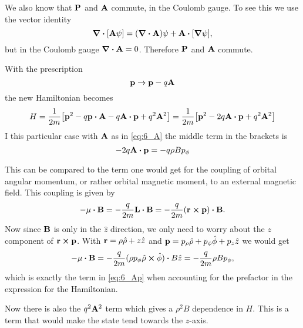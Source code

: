 \documentclass[11pt,letter, swedish, english
]{article}
\begin{document}
We also know that $\vb{P}$ and $\vb{A}$ commute, in the Coulomb
gauge. To see this we use the vector identity
\begin{equation}
\div[\vb{A}\psi]=(\div\vb{A})\psi + \vb{A}\vdot[\grad\psi],
\end{equation}
but in the Coulomb gauge $\div\vb{A}=0$. Therefore $\vb{P}$ and
$\vb{A}$ commute. 

With the prescription
\begin{equation}
\vb{p}\to \vb{p}-q\vb{A}
\end{equation}
the new Hamiltonian becomes
\begin{equation}
H=\frac{1}{2m}\qty[\vb{p}^2-q\vb{p}\vdot\vb{A}-q\vb{A}\vdot\vb{p}+q^2\vb{A}^2]
=\frac{1}{2m}\qty[\vb{p}^2-2q\vb{A}\vdot\vb{p}+q^2\vb{A}^2]
\end{equation}
I this particular case with $\vb{A}$ as in \eqref{eq:6_A} the middle
term in the brackets is
\begin{equation}
-2q\vb{A}\vdot\vb{p}=-q\rho B p_\phi
\end{equation}


This can be compared to the term one would get for the coupling
of orbital angular momentum, or rather orbital magnetic moment,
to an external magnetic field. This coupling is given by
\begin{equation}\label{eq:6_Ap}
-\vb{\mu}\vdot\vb{B}=-\frac{q}{2m}\vb{L}\vdot\vb{B}
=-\frac{q}{2m}(\vb{r}\cross\vb{p})\vdot\vb{B}.
\end{equation}
Now since $\vb{B}$ is only in the $\hat{z}$ direction, we
only need to worry about the $z$ component of
$\vb{r}\cross\vb{p}$. With $\vb{r}=\rho\hat\rho+z\hat{z}$ and
$\vb{p}=p_\rho\hat\rho + p_\phi\hat\phi+p_z\hat{z}$ we would get
\begin{equation}
-\vb{\mu}\vdot\vb{B}
=-\frac{q}{2m}(\rho p_\phi \hat\rho\cross\hat\phi)\vdot B\hat{z}
=-\frac{q}{2m}\rho B p_\phi,
\end{equation}
which is exactly the term in \eqref{eq:6_Ap} when accounting for the
prefactor in the expression for the Hamiltonian.

Now there is also the $q^2\vb{A}^2$ term which gives a $\rho^2B$
dependence in $H$. This is a term that would make the state tend
towards the $z$-axis. 
\end{document}
